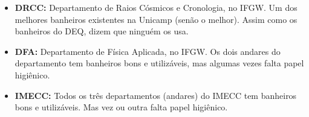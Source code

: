 \begin{itemize}
\item  \textbf{DRCC:} Departamento de Raios Cósmicos e Cronologia, no IFGW. Um dos melhores banheiros existentes na Unicamp (senão o melhor). Assim como os banheiros do DEQ, dizem que ninguém os usa.
\end{itemize}

\begin{itemize}
\item  \textbf{DFA:} Departamento de Física Aplicada, no IFGW. Os dois andares do departamento tem banheiros bons e utilizáveis, mas algumas vezes falta papel higiênico.
\end{itemize}

\begin{itemize}
\item  \textbf{IMECC:} Todos os três departamentos (andares) do IMECC tem banheiros bons e utilizáveis. Mas vez ou outra falta papel higiênico.
\end{itemize}


